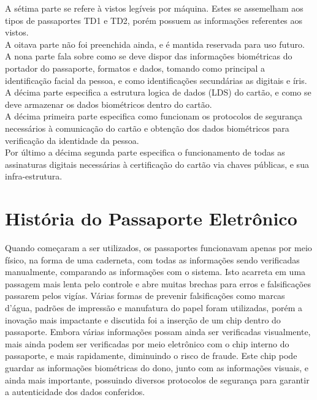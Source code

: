\documentclass{article}
\begin{document}
\begin{justify}
				\hspace*{2cm} A sétima parte se refere à vistos legíveis por máquina. Estes se assemelham aos tipos de passaportes TD1 e TD2, porém possuem as informações referentes aos vistos.\\
				\hspace*{2cm} A oitava parte não foi preenchida ainda, e é mantida reservada para uso futuro.\\
				\hspace*{2cm} A nona parte fala sobre como se deve dispor das informações biométricas do portador do passaporte, formatos e dados, tomando como principal a identificação facial da pessoa, e como identificações secundárias as digitais e íris.\\
				\hspace*{2cm} A décima parte especifica a estrutura logica de dados (LDS) do cartão, e como se deve armazenar os dados biométricos dentro do cartão.\\
				\hspace*{2cm} A décima primeira parte especifica como funcionam os protocolos de segurança necessários à comunicação do cartão e obtenção dos dados biométricos para verificação da identidade da pessoa.\\
				\hspace*{2cm} Por último a décima segunda parte especifica o funcionamento de todas as assinaturas digitais necessárias à certificação do cartão via chaves públicas, e sua infra-estrutura.\\

		\end{justify}

	\section{História do Passaporte Eletrônico}
		\begin{justify}
			
			\hspace{2cm}Quando começaram a ser utilizados, os passaportes funcionavam apenas por meio físico, na forma de uma caderneta, com todas as informações sendo verificadas manualmente, comparando as informações com o sistema. Isto acarreta em uma passagem mais lenta pelo controle e abre muitas brechas para erros e falsificações passarem pelos vigías. Várias formas de prevenir falsificações como marcas d’água, padrões de impressão e manufatura do papel foram utilizadas, porém a inovação mais impactante e discutida foi a inserção de um chip dentro do passaporte. Embora várias informações possam ainda ser verificadas visualmente, mais ainda podem ser verificadas por meio eletrônico com o chip interno do passaporte, e mais rapidamente, diminuindo o risco de fraude. Este chip pode guardar as informações biométricas do dono, junto com as informações visuais, e ainda mais importante, possuindo diversos protocolos de segurança para garantir a autenticidade dos dados conferidos.
			
		\end{justify}
\end{document}
